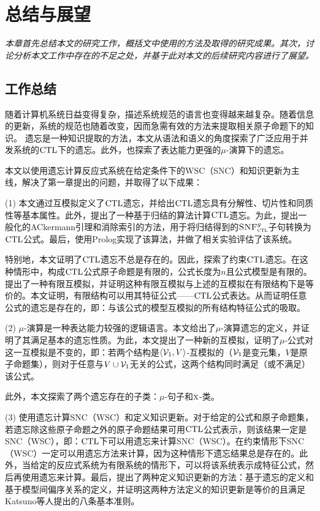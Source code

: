 \chapter{总结与展望}\label{chapter09}
{\em 本章首先总结本文的研究工作，概括文中使用的方法及取得的研究成果。其次，讨论分析本文工作中存在的不足之处，并基于此对本文的后续研究内容进行了展望。}

\section{工作总结}
随着计算机系统日益变得复杂，描述系统规范的语言也变得越来越复杂。随着信息的更新，系统的规范也随着改变，因而急需有效的方法来提取相关原子命题下的知识。
遗忘是一种知识提取的方法，本文从语法和语义的角度探索了广泛应用于并发系统的$\textrm{CTL}$下的遗忘。此外，也探索了表达能力更强的$\mu$-演算下的遗忘。

本文以使用遗忘计算反应式系统在给定条件下的WSC（SNC）和知识更新为主线，解决了第一章提出的问题，并取得了以下成果：

(1) 本文通过互模拟定义了$\textrm{CTL}$遗忘，并给出$\textrm{CTL}$遗忘具有分解性、切片性和同质性等基本属性。此外，提出了一种基于归结的算法计算$\textrm{CTL}$遗忘。为此，提出一般化的ACkermann引理和消除索引的方法，用于将归结得到的${\textsc{SNF}_{\textsc{ctl}}^g}$子句转换为$\textrm{CTL}$公式。最后，使用Prolog实现了该算法，并做了相关实验评估了该系统。

特别地，本文证明了$\textrm{CTL}$遗忘不总是存在的。因此，探索了约束$\textrm{CTL}$遗忘。在这种情形中，构成$\textrm{CTL}$公式原子命题是有限的，公式长度为$n$且公式模型是有限的。提出了一种有限互模拟，并证明这种有限互模拟与上述的互模拟在有限结构下是等价的。本文证明，有限结构可以用其特征公式——$\textrm{CTL}$公式表达。从而证明任意公式的遗忘是存在的，即：与该公式的模型互模拟的所有结构特征公式的吸取。

(2) $\mu$-演算是一种表达能力较强的逻辑语言。本文给出了$\mu$-演算遗忘的定义，并证明了其满足基本的遗忘性质。为此，本文提出了一种新的互模拟，证明了$\mu$-公式对这一互模拟是不变的，即：若两个结构是${\langle{{\cal V}_1, V}\rangle}$-互模拟的（${\cal V}_1$是变元集，$V$是原子命题集），则对于任意与$V\cup {\cal V}_1$无关的公式，这两个结构同时满足（或不满足）该公式。

此外，本文探索了两个遗忘存在的子类：$\mu$-句子和$\textsc{x}$-类。

(3) 使用遗忘计算SNC（WSC）和定义知识更新。对于给定的公式和原子命题集，若遗忘除这些原子命题之外的原子命题结果可用$\textrm{CTL}$公式表示，则该结果一定是SNC（WSC），即：$\textrm{CTL}$下可以用遗忘来计算SNC（WSC）。在约束情形下SNC（WSC）一定可以用遗忘方法来计算，因为这种情形下遗忘结果总是存在的。此外，当给定的反应式系统为有限系统的情形下，可以将该系统表示成特征公式，然后再使用遗忘来计算。最后，提出了两种定义知识更新的方法：基于遗忘的定义和基于模型间偏序关系的定义，并证明这两种方法定义的知识更新是等价的且满足Katsuno等人提出的八条基本准则。

